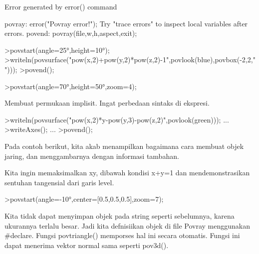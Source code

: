 \documentclass{article}
\begin{document}
\begin{eulernotebook}
\begin{euleroutput}
  Error generated by error() command
  
  povray:
      error("Povray error!");
  Try "trace errors" to inspect local variables after errors.
  povend:
      povray(file,w,h,aspect,exit); 
\end{euleroutput}
\begin{eulerprompt}
>povstart(angle=25°,height=10°); 
>writeln(povsurface("pow(x,2)+pow(y,2)*pow(z,2)-1",povlook(blue),povbox(-2,2,"")));
>povend();
\end{eulerprompt}
\begin{eulerprompt}
>povstart(angle=70°,height=50°,zoom=4);
\end{eulerprompt}
\begin{eulercomment}
Membuat permukaan implisit. Ingat perbedaan sintaks di ekspresi.
\end{eulercomment}
\begin{eulerprompt}
>writeln(povsurface("pow(x,2)*y-pow(y,3)-pow(z,2)",povlook(green))); ...
>writeAxes(); ...
>povend();
\end{eulerprompt}
\begin{eulercomment}
Pada contoh berikut, kita akab menampilkan bagaimana cara membuat
objek jaring, dan menggambarnya dengan informasi tambahan.

Kita ingin memaksimalkan xy, dibawah kondisi x+y=1 dan
mendemonstrasikan sentuhan tangensial dari garis level.
\end{eulercomment}
\begin{eulerprompt}
>povstart(angle=-10°,center=[0.5,0.5,0.5],zoom=7);
\end{eulerprompt}
\begin{eulercomment}
Kita tidak dapat menyimpan objek pada string seperti sebelumnya,
karena ukurannya terlalu besar. Jadi kita defnisiikan objek di file
Povray menggunakan #declare. Fungsi povtriangle() memporses hal ini
secara otomatis. Fungsi ini dapat menerima vektor normal sama seperti
pov3d().


\end{eulercomment}
\end{eulernotebook}
\end{document}
